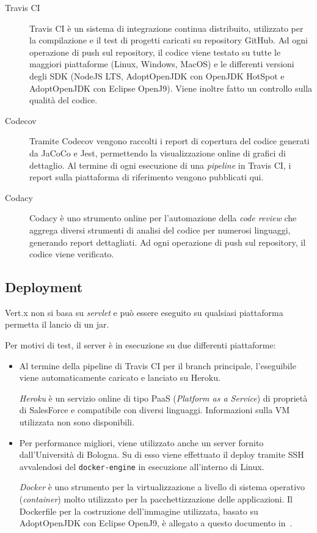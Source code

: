     \begin{description}
      \item[Travis CI]
        Travis CI è un sistema di integrazione continua distribuito, utilizzato per la compilazione e il test di progetti caricati su repository GitHub.
        Ad ogni operazione di push sul repository, il codice viene testato su tutte le maggiori piattaforme (Linux, Windows, MacOS) e le differenti versioni degli SDK (NodeJS LTS, AdoptOpenJDK con OpenJDK HotSpot e AdoptOpenJDK con Eclipse OpenJ9).
        Viene inoltre fatto un controllo sulla qualità del codice.

      \item[Codecov]
        Tramite Codecov vengono raccolti i report di copertura del codice generati da JaCoCo e Jest, permettendo la visualizzazione online di grafici di dettaglio.
        Al termine di ogni esecuzione di una \emph{pipeline} in Travis CI, i report sulla piattaforma di riferimento vengono pubblicati qui.

      \item[Codacy]
        Codacy è uno strumento online per l'automazione della \emph{code review} che aggrega diversi strumenti di analisi del codice per numerosi linguaggi, generando report dettagliati.
        Ad ogni operazione di push sul repository, il codice viene verificato.
    \end{description}

  \subsection{Deployment}
  Vert.x non si basa su \emph{servlet} e può essere eseguito su qualsiasi piattaforma permetta il lancio di un jar.

  Per motivi di test, il server è in esecuzione su due differenti piattaforme:

  \begin{itemize}
    \item
      Al termine della pipeline di Travis CI per il branch principale, l'eseguibile viene automaticamente caricato e lanciato su Heroku.

      \emph{Heroku} è un servizio online di tipo PaaS (\emph{\emph{P}latform as a \emph{S}ervice}) di proprietà di SalesForce e compatibile con diversi linguaggi.
      Informazioni sulla VM utilizzata non sono disponibili.
    \item
      Per performance migliori, viene utilizzato anche un server fornito dall'Università di Bologna.
      Su di esso viene effettuato il deploy tramite SSH avvalendosi del \texttt{docker-engine} in esecuzione all'interno di Linux.

      \emph{Docker} è uno strumento per la virtualizzazione a livello di sistema operativo (\emph{container}) molto utilizzato per la pacchettizzazione delle applicazioni.
      Il Dockerfile per la costruzione dell'immagine utilizzata, basato su AdoptOpenJDK con Eclipse OpenJ9, è allegato a questo documento in~.
  \end{itemize}

